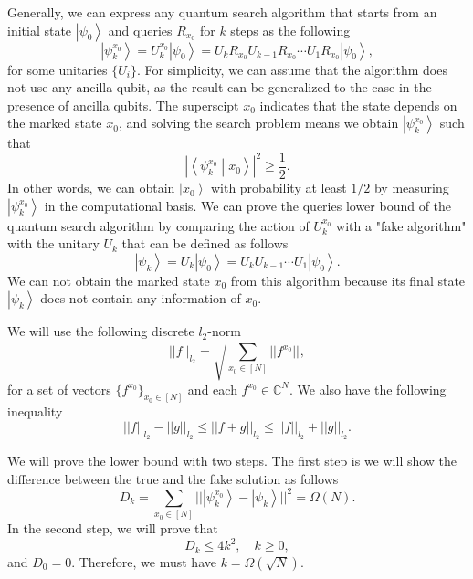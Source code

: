 \documentclass[11pt]{article}
\newcommand{\braket}[2]{\left \langle #1 \middle| #2 \right \rangle}
\newcommand{\ket}[1]{\left|#1\right\rangle}
\begin{document}
Generally, we can express any quantum search algorithm that starts from an initial state $\ket{\psi_0}$ and queries $R_{x_0}$ for $k$ steps as the following 
\begin{equation}
    \ket{\psi_k^{x_0}} = U_k^{x_0}\ket{\psi_0} = U_kR_{x_0}U_{k-1}R_{x_0}\cdots U_1R_{x_0}\ket{\psi_0},
\end{equation}
for some unitaries $\{U_i\}$. For simplicity, we can assume that the algorithm does not use any ancilla qubit, as the result can be generalized to the case in the presence of ancilla qubits. The superscipt $x_0$ indicates that the state depends on the marked state $x_0$, and solving the search problem means we obtain $\ket{\psi_k^{x_0}}$ such that 
\begin{equation}
    |\braket{\psi_k^{x_0}}{x_0}|^2 \geq \frac{1}{2}.
\end{equation}
In other words, we can obtain $\ket{x_0}$ with probability at least $1/2$ by measuring $\ket{\psi_k^{x_0}}$ in the computational basis. We can prove the queries lower bound of the quantum search algorithm by comparing the action of $U_k^{x_0}$ with a "fake algorithm" with the unitary $U_k$ that can be defined as follows 
\begin{equation}
    \ket{\psi_k} = U_k\ket{\psi_0} = U_kU_{k-1}\cdots U_1\ket{\psi_0}.
\end{equation}
We can not obtain the marked state $x_0$ from this algorithm because its final state $\ket{\psi_k}$ does not contain any information of $x_0$.

We will use the following discrete $l_2$-norm
\begin{equation}
    ||f||_{l_2} = \sqrt{\sum_{x_0\in[N]}||f^{x_0}||},
\end{equation}
for a set of vectors $\{f^{x_0}\}_{x_0\in[N]}$ and each $f^{x_0} \in \mathbb{C}^N$. We also have the following inequality 
\begin{equation}
    ||f||_{l_2} - ||g||_{l_2} \leq ||f + g||_{l_2} \leq ||f||_{l_2} + ||g||_{l_2}.
\end{equation}

We will prove the lower bound with two steps. The first step is we will show the difference between the true and the fake solution as follows 
\begin{equation}
    D_k = \sum_{x_0\in[N]}||\ket{\psi_k^{x_0}} - \ket{\psi_k}||^2 = \Omega(N).
\end{equation}
In the second step, we will prove that 
\begin{equation}
    D_k \leq 4k^2, \quad k \geq 0,
\end{equation}
and $D_0 = 0$. Therefore, we must have $k = \Omega(\sqrt{N})$. 
\end{document}
